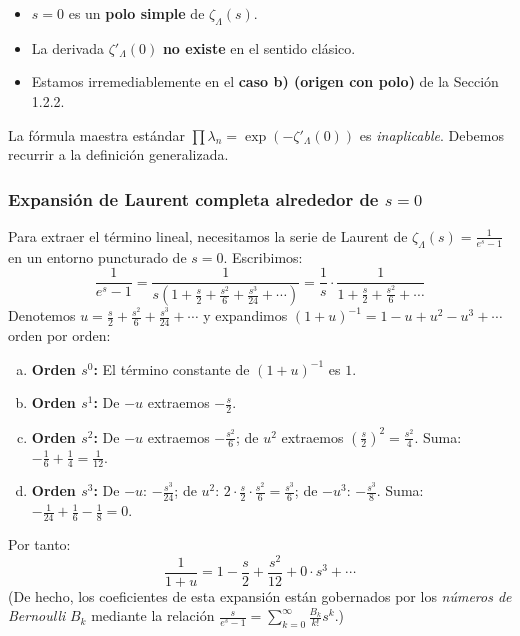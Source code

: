 \begin{itemize}
    \item $s = 0$ es un \textbf{polo simple} de $\zeta_\Lambda(s)$.
    \item La derivada $\zeta'_\Lambda(0)$ \textbf{no existe} en el sentido clásico.
    \item Estamos irremediablemente en el \textbf{caso b) (origen con polo)} de la Sección 1.2.2.
\end{itemize}

La fórmula maestra estándar $\prod \lambda_n = \exp(-\zeta'_\Lambda(0))$ es \textit{inaplicable}. Debemos recurrir a la definición generalizada.

\subsubsection*{Expansión de Laurent completa alrededor de $s=0$}

Para extraer el término lineal, necesitamos la serie de Laurent de $\zeta_\Lambda(s) = \frac{1}{e^s - 1}$ en un entorno puncturado de $s=0$. Escribimos:
$$ \frac{1}{e^s - 1} = \frac{1}{s\left(1 + \frac{s}{2} + \frac{s^2}{6} + \frac{s^3}{24} + \cdots\right)} = \frac{1}{s} \cdot \frac{1}{1 + \frac{s}{2} + \frac{s^2}{6} + \cdots} $$
Denotemos $u = \frac{s}{2} + \frac{s^2}{6} + \frac{s^3}{24} + \cdots$ y expandimos $(1+u)^{-1} = 1 - u + u^2 - u^3 + \cdots$ orden por orden:

\begin{enumerate}[a)]
    \item \textbf{Orden $s^0$:} El término constante de $(1+u)^{-1}$ es $1$.
    \item \textbf{Orden $s^1$:} De $-u$ extraemos $-\frac{s}{2}$.
    \item \textbf{Orden $s^2$:} De $-u$ extraemos $-\frac{s^2}{6}$; de $u^2$ extraemos $\left(\frac{s}{2}\right)^2 = \frac{s^2}{4}$. Suma: $-\frac{1}{6} + \frac{1}{4} = \frac{1}{12}$.
    \item \textbf{Orden $s^3$:} De $-u$: $-\frac{s^3}{24}$; de $u^2$: $2\cdot\frac{s}{2}\cdot\frac{s^2}{6} = \frac{s^3}{6}$; de $-u^3$: $-\frac{s^3}{8}$. Suma: $-\frac{1}{24} + \frac{1}{6} - \frac{1}{8} = 0$.
\end{enumerate}

Por tanto:
$$ \frac{1}{1+u} = 1 - \frac{s}{2} + \frac{s^2}{12} + 0 \cdot s^3 + \cdots $$
(De hecho, los coeficientes de esta expansión están gobernados por los \textit{números de Bernoulli} $B_k$ mediante la relación $\frac{s}{e^s-1} = \sum_{k=0}^{\infty} \frac{B_k}{k!} s^k$.)

